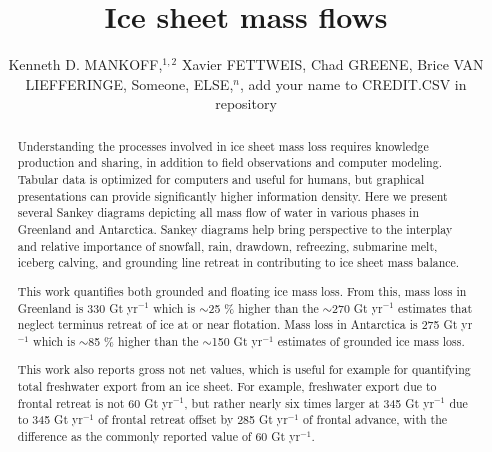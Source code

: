 \documentclass[jog]{igs}
\begin{document}
\title[Sankey mass flows]{Ice sheet mass flows}

\author[Mankoff and others]
       {Kenneth D. MANKOFF,$^{1,2}$
         Xavier FETTWEIS,
         Chad GREENE,
         Brice VAN LIEFFERINGE,
         Someone, ELSE,$^n$,
       add your name to CREDIT.CSV in repository}


\begin{frontmatter}
\maketitle
\begin{abstract}

  Understanding the processes involved in ice sheet mass loss requires knowledge production and sharing, in addition to field observations and computer modeling. Tabular data is optimized for computers and useful for humans, but graphical presentations can provide significantly higher information density. Here we present several Sankey diagrams depicting all mass flow of water in various phases in Greenland and Antarctica. Sankey diagrams help bring perspective to the interplay and relative importance of snowfall, rain, drawdown, refreezing, submarine melt, iceberg calving, and grounding line retreat in contributing to ice sheet mass balance.

  This work quantifies both grounded and floating ice mass loss. From this, mass loss in Greenland is 330 Gt yr$^{-1}$ which is \(\sim\)25 \% higher than the \(\sim\)270 Gt yr$^{-1}$ estimates that neglect terminus retreat of ice at or near flotation. Mass loss in Antarctica is 275 Gt yr$^{-1}$ which is \(\sim\)85 \% higher than the \(\sim\)150 Gt yr$^{-1}$ estimates of grounded ice mass loss.

  This work also reports gross not net values, which is useful for example for quantifying total freshwater export from an ice sheet. For example, freshwater export due to frontal retreat is not 60 Gt yr$^{-1}$, but rather nearly six times larger at 345 Gt yr$^{-1}$ due to 345 Gt yr$^{-1}$ of frontal retreat offset by 285 Gt yr$^{-1}$ of frontal advance, with the difference as the commonly reported value of 60 Gt yr$^{-1}$.
\end{abstract}
\end{frontmatter}
\end{document}
